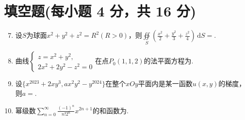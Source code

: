 \documentclass[../main.tex]{subfiles}
\begin{document}
\section{填空题(每小题 4 分，共 16 分)}
\begin{enumerate}
    \setcounter{enumi}{6}
    \item 设$S$为球面$x^2+y^2+z^2=R^2(R>0)$，则$\oiint\limits_{S}\left(\frac{x^2}{2}+\frac{y^2}{3}+\frac{z^2}{4}\right)\,\mathrm{d}S=$\underline{\hspace{5em}}.
          \vspace{1em}
    \item 曲线$\begin{cases}z=x^2+y^2,\\2x^2+2y^2-z^2=0\end{cases}$在点$P_0(1,1,2)$的法平面方程为\underline{\hspace{5em}}.
          \vspace{1em}
    \item 设$\{x^{2023}+2xy^3,ax^2y^2-y^{2024}\}$在整个$xOy$平面内是某一函数$u(x,y)$的梯度，则$a=$\underline{\hspace{5em}}.
          \vspace{1em}
    \item 幂级数$\displaystyle\sum_{n=0}^{\infty}\frac{(-1)^n}{n!2^n}x^{2n+1}$的和函数为\underline{\hspace{5em}}.
          \vspace{1em}
\end{enumerate}
\end{document}

